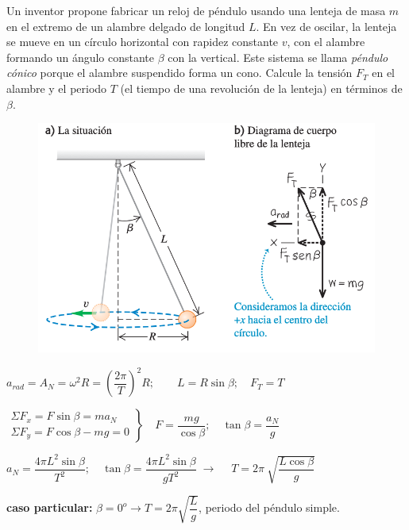 \begin{prob}
	Un inventor propone fabricar un reloj de péndulo usando una lenteja de masa $m$ en el extremo de un alambre delgado de longitud $L$. En vez de oscilar, la lenteja se mueve en un círculo horizontal con rapidez constante $v$, con el alambre formando un ángulo constante $\beta$ con la vertical. Este sistema se llama \textit{péndulo cónico} porque el alambre suspendido forma un cono. Calcule la tensión $F_T$ en el alambre y el periodo $T$ (el tiempo de una revolución de la lenteja) en términos de $\beta$.
\end{prob}
\begin{figure}[H]
	\centering
	\includegraphics[width=.8\textwidth]{imagenes/imagenes03/T03IM43.png}
	\end{figure}

$a_{rad}=A_N=\omega^2 R=\left( \dfrac {2\pi}{T} \right)^2 R;\qquad L=R \sin \beta; \quad F_T=T$

$\left. \begin{array}{ll}
\Sigma F_x=F \sin \beta = m a_N \\ \Sigma F_y=F \cos \beta -mg=0
 \end{array}\right\} \quad F=\dfrac{mg}{\cos \beta}; \quad \tan \beta=\dfrac{a_N}{g} $

$ a_N=\dfrac{4 \pi L^2 \sin \beta}{T^2}; \quad \tan \beta =\dfrac{4 \pi L^2 \sin \beta}{gT^2}\; \to \;  \quad T=2\pi \ \sqrt{\dfrac{L \cos \beta}{g}}$

\textbf{caso particular:} $\beta=0^o \to T=2\pi \sqrt{\dfrac L g}$, periodo del péndulo simple. \\ %

